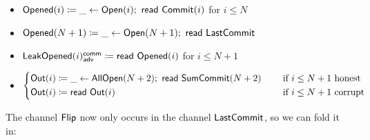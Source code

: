 \begin{itemize}
\item {\color{red} $\mathsf{Opened}(i) \coloneqq \_ \leftarrow \mathsf{Open}(i); \ \mathsf{read} \ \mathsf{Commit}(i)$ for $i \leq N$}
\item {\color{red} $\mathsf{Opened}(N+1) \coloneqq \_ \leftarrow \mathsf{Open}(N+1); \ \mathsf{read} \ \mathsf{LastCommit}$}
\item {\color{red} $\mathsf{LeakOpened}(i)^{\mathsf{comm}}_{\mathsf{adv}} \coloneqq \mathsf{read} \ \mathsf{Opened}(i)$ for $i \leq N+1$}
\item $\begin{cases*} \Out(i) \coloneqq \_ \leftarrow \AllOpen(N+2); \ \read{\SumCommit(N+2)} & \hspace{10pt} \text{if $i \leq N+1$ honest} \\ \Out(i) \coloneqq \read{\Out(i)} & \hspace{10pt} \text{if $i \leq N+1$ corrupt} \end{cases*}$
\end{itemize}

\noindent The channel $\mathsf{Flip}$ now only occurs in the channel $\mathsf{LastCommit}$, so we can fold it in:


